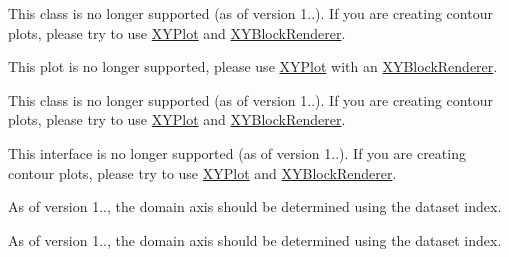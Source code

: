 \begin{DoxyRefList}
\item[\label{deprecated__deprecated000053}%
\Hypertarget{deprecated__deprecated000053}%
Class \mbox{\hyperlink{classorg_1_1jfree_1_1chart_1_1plot_1_1_color_palette}{org.jfree.chart.plot.Color\+Palette}} ]This class is no longer supported (as of version 1..). If you are creating contour plots, please try to use \mbox{\hyperlink{classorg_1_1jfree_1_1chart_1_1plot_1_1_x_y_plot}{X\+Y\+Plot}} and \mbox{\hyperlink{}{X\+Y\+Block\+Renderer}}.  
\item[\label{deprecated__deprecated000054}%
\Hypertarget{deprecated__deprecated000054}%
Class \mbox{\hyperlink{classorg_1_1jfree_1_1chart_1_1plot_1_1_contour_plot}{org.jfree.chart.plot.Contour\+Plot}} ]This plot is no longer supported, please use \mbox{\hyperlink{classorg_1_1jfree_1_1chart_1_1plot_1_1_x_y_plot}{X\+Y\+Plot}} with an \mbox{\hyperlink{}{X\+Y\+Block\+Renderer}}.  
\item[\label{deprecated__deprecated000055}%
\Hypertarget{deprecated__deprecated000055}%
Class \mbox{\hyperlink{classorg_1_1jfree_1_1chart_1_1plot_1_1_contour_plot_utilities}{org.jfree.chart.plot.Contour\+Plot\+Utilities}} ]This class is no longer supported (as of version 1..). If you are creating contour plots, please try to use \mbox{\hyperlink{classorg_1_1jfree_1_1chart_1_1plot_1_1_x_y_plot}{X\+Y\+Plot}} and \mbox{\hyperlink{}{X\+Y\+Block\+Renderer}}.  
\item[\label{deprecated__deprecated000056}%
\Hypertarget{deprecated__deprecated000056}%
Class \mbox{\hyperlink{interfaceorg_1_1jfree_1_1chart_1_1plot_1_1_contour_value_plot}{org.jfree.chart.plot.Contour\+Value\+Plot}} ]This interface is no longer supported (as of version 1..). If you are creating contour plots, please try to use \mbox{\hyperlink{classorg_1_1jfree_1_1chart_1_1plot_1_1_x_y_plot}{X\+Y\+Plot}} and \mbox{\hyperlink{}{X\+Y\+Block\+Renderer}}.  
\item[\label{deprecated__deprecated000060}%
\Hypertarget{deprecated__deprecated000060}%
Member \mbox{\hyperlink{classorg_1_1jfree_1_1chart_1_1plot_1_1_crosshair_state_a6e25ddb850af1b53b22b5f4a261a0d3a}{org.jfree.chart.plot.Crosshair\+State.get\+Domain\+Axis\+Index}} ()]As of version 1.., the domain axis should be determined using the dataset index.  
\item[\label{deprecated__deprecated000061}%
\Hypertarget{deprecated__deprecated000061}%
Member \mbox{\hyperlink{classorg_1_1jfree_1_1chart_1_1plot_1_1_crosshair_state_a1d8ed3f6288c58aa0ea6c6eac78765b2}{org.jfree.chart.plot.Crosshair\+State.get\+Range\+Axis\+Index}} ()]As of version 1.., the domain axis should be determined using the dataset index.  

\end{DoxyRefList}
